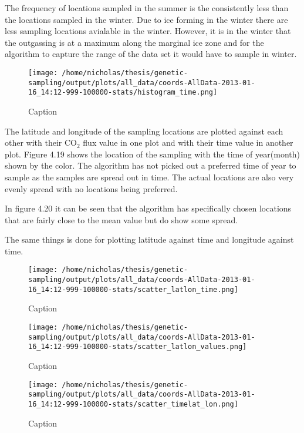 \documentclass[11pt, a4paper]{article}
\numberwithin{figure}{section}
\numberwithin{table}{section}
\begin{document}
The frequency of locations sampled in the summer is the consistently
less than the locations sampled in the winter. Due to ice forming 
in the winter there are less sampling locations avialable in the winter.
However, it is in the winter that the outgassing is at a maximum along
the marginal ice zone and for the algorithm to capture
the range of the data set it would have to sample in winter.

\begin{figure}[H]
\caption{Caption}
\centering
\texttt{[image: /home/nicholas/thesis/genetic-sampling/output/plots/all\_data/coords-AllData-2013-01-16\_14:12-999-100000-stats/histogram\_time.png]}
\end{figure}

The latitude and longitude of the sampling locations are plotted 
against each other with their CO$_2$ flux value in one plot and with 
their time value in another plot.
Figure 4.19 shows the location of the sampling with the time of 
year(month) shown by the color.
The algorithm has not picked out a preferred time of year to sample
as the samples are spread out in time.
The actual locations are also very evenly spread with no locations 
being preferred.

In figure 4.20 it can be seen that the algorithm has specifically chosen locations that
are fairly close to the mean value but do show some spread.

The same things is done for plotting latitude against time and
longitude against time.
    
\begin{figure}[H]
\caption{Caption}
\centering
\texttt{[image: /home/nicholas/thesis/genetic-sampling/output/plots/all\_data/coords-AllData-2013-01-16\_14:12-999-100000-stats/scatter\_latlon\_time.png]}
\end{figure}

\begin{figure}[H]
\caption{Caption}
\centering
\texttt{[image: /home/nicholas/thesis/genetic-sampling/output/plots/all\_data/coords-AllData-2013-01-16\_14:12-999-100000-stats/scatter\_latlon\_values.png]}
\end{figure}

\begin{figure}[H]
\caption{Caption}
\centering
\texttt{[image: /home/nicholas/thesis/genetic-sampling/output/plots/all\_data/coords-AllData-2013-01-16\_14:12-999-100000-stats/scatter\_timelat\_lon.png]}
\end{figure}
\end{document}
